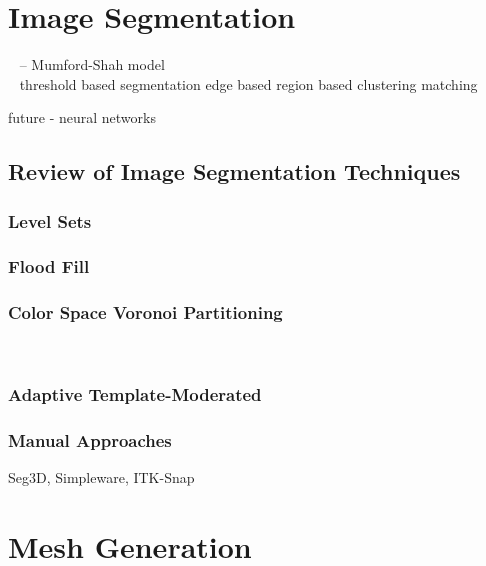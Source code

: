 \documentclass[12pt]{article}
\begin{document}
\section{Image Segmentation}
\label{Image Segmentation}
~\cite{morel} -- Mumford-Shah model\\
~\cite{mitiche}
threshold based segmentation
edge based
region based
clustering
matching

future - neural networks

\subsection{Review of Image Segmentation Techniques}
\label{Review of Image Segmentation Techniques}
\subsubsection{Level Sets}
\label{Level Sets}

\subsubsection{Flood Fill}
\label{Flood Fill}
\subsubsection{Color Space Voronoi Partitioning}
\label{Color Space Voronoi Partitioning}
~\cite{lcevt}
\subsubsection{Adaptive Template-Moderated}
\label{Adaptive Template-Moderated}
\subsubsection{Manual Approaches}
\label{Manual Approaches}
Seg3D, Simpleware, ITK-Snap
\newpage
\section{Mesh Generation}
\label{Mesh Generation}
\end{document}
